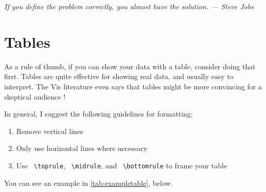 

\newpage
\vspace{2em}
\begin{center}
    \emph{If you define the problem correctly, you almost have the solution. --- Steve Jobs}
\end{center}

\section{Tables}
As a rule of thumb, if you can show your data with a table, consider doing that first. Tables are quite effective for showing real data, and usually easy to interpret. The Vis literature even says that tables might be more convincing for a skeptical audience \cite{pandey2014persuasive}!

In general, I suggest the following guidelines for formatting: 
\begin{enumerate}
    \item Remove vertical lines
    \item Only use horizontal lines where necessary
    \item Use \texttt{ \textbackslash toprule}, \texttt{ \textbackslash midrule}, and \texttt{ \textbackslash bottomrule} to frame your table
\end{enumerate}

You can see an example in \autoref{tab:exampletable}, below.

